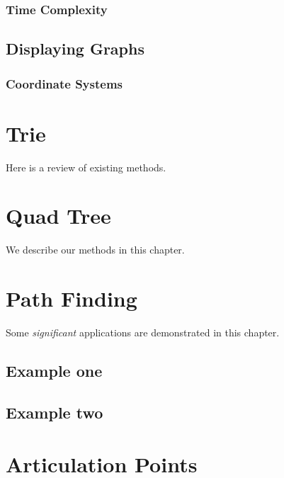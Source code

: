\documentclass[
]{book}
\begin{document}
\hypertarget{time-complexity}{%
\subsection{Time Complexity}\label{time-complexity}}

\hypertarget{displaying-graphs}{%
\section{Displaying Graphs}\label{displaying-graphs}}

\hypertarget{coordinate-systems}{%
\subsection{Coordinate Systems}\label{coordinate-systems}}

\hypertarget{trie}{%
\chapter{Trie}\label{trie}}

Here is a review of existing methods.

\hypertarget{qtree}{%
\chapter{Quad Tree}\label{qtree}}

We describe our methods in this chapter.

\hypertarget{pfind}{%
\chapter{Path Finding}\label{pfind}}

Some \emph{significant} applications are demonstrated in this chapter.

\hypertarget{example-one}{%
\section{Example one}\label{example-one}}

\hypertarget{example-two}{%
\section{Example two}\label{example-two}}

\hypertarget{artpts}{%
\chapter{Articulation Points}\label{artpts}}
\end{document}
